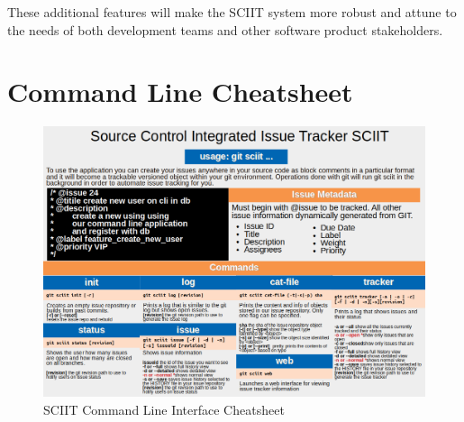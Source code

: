 \documentclass{mproj}
\begin{document}
These additional features will make the SCIIT system more robust and attune to the needs of both development teams and other software product stakeholders.


\appendix %
\chapter{Command Line Cheatsheet}
\begin{figure}[h!]
\caption{SCIIT Command Line Interface Cheatsheet}
\label{fig:sciit-cheatsheet}
\centering
\includegraphics[width=16cm]{Cheatsheet}
\end{figure}




\end{document}
